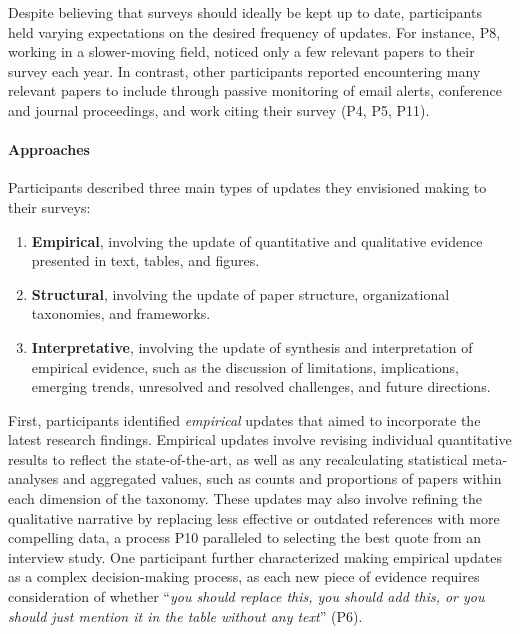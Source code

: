 Despite believing that surveys should ideally be kept up to date, participants held varying expectations on the desired frequency of updates. For instance, P8, working in a slower-moving field, noticed only a few relevant papers to their survey each year. In contrast, other participants reported encountering many relevant papers to include through passive monitoring of email alerts, conference and journal proceedings, and work citing their survey (P4, P5, P11).

\paragraph{\textbf{Approaches}}
Participants described three main types of updates they envisioned making to their surveys:
\begin{enumerate}[label=\arabic*.]
    \item \textbf{Empirical}, involving the update of quantitative and qualitative evidence presented in text, tables, and figures.
    \item \textbf{Structural}, involving the update of paper structure, organizational taxonomies, and frameworks.
    \item \textbf{Interpretative}, involving the update of synthesis and interpretation of empirical evidence, such as the discussion of limitations, implications, emerging trends, unresolved and resolved challenges, and future directions.
\end{enumerate}

First, participants identified \textit{empirical} updates that aimed to incorporate the latest research findings. Empirical updates involve revising individual quantitative results to reflect the state-of-the-art, as well as any recalculating statistical meta-analyses and aggregated values, such as counts and proportions of papers within each dimension of the taxonomy. These updates may also involve refining the qualitative narrative by replacing less effective or outdated references with more compelling data, a process P10 paralleled to selecting the best quote from an interview study. One participant further characterized making empirical updates as a complex decision-making process, as each new piece of evidence requires consideration of whether ``\textit{you should replace this, you should add this, or you should just mention it in the table without any text}'' (P6).


